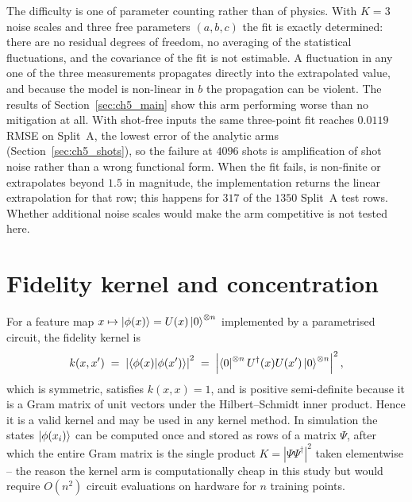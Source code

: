 The difficulty is one of parameter counting rather than of physics. With $K = 3$
noise scales and three free parameters $(a, b, c)$ the fit is exactly determined:
there are no residual degrees of freedom, no averaging of the statistical
fluctuations, and the covariance of the fit is not estimable. A fluctuation in any
one of the three measurements propagates directly into the extrapolated value, and
because the model is non-linear in $b$ the propagation can be violent. The results
of Section~\ref{sec:ch5_main} show this arm performing worse than no mitigation at
all. With shot-free inputs the same three-point fit reaches $0.0119$ RMSE on Split~A,
the lowest error of the analytic arms (Section~\ref{sec:ch5_shots}), so the failure at
$4096$ shots is amplification of shot noise rather than a wrong functional form. When
the fit fails, is non-finite or extrapolates beyond $1.5$ in magnitude, the
implementation returns the linear extrapolation for that row; this happens for $317$
of the $1350$ Split~A test rows. Whether additional noise scales would make the arm
competitive is not tested here.

\section{Fidelity kernel and concentration}
\label{sec:appA_kernel}

For a feature map $x \mapsto \ket{\phi(x)} = U(x)\ket{0}^{\otimes n}$ implemented by
a parametrised circuit, the fidelity kernel is
\begin{equation}
    k(x, x') \;=\; \left| \braket{\phi(x) | \phi(x')} \right|^{2}
    \;=\; \left| \bra{0}^{\otimes n} U^{\dagger}(x) U(x') \ket{0}^{\otimes n} \right|^{2},
    \label{eq:appA_fidelity}
\end{equation}
which is symmetric, satisfies $k(x,x) = 1$, and is positive semi-definite because it
is a Gram matrix of unit vectors under the Hilbert--Schmidt inner product. Hence it
is a valid kernel and may be used in any kernel method. In simulation the states
$\ket{\phi(x_i)}$ can be computed once and stored as rows of a matrix $\Psi$, after
which the entire Gram matrix is the single product
$K = \left| \Psi \Psi^{\dagger} \right|^{2}$ taken elementwise -- the reason the
kernel arm is computationally cheap in this study but would require
$O(n^2)$ circuit evaluations on hardware for $n$ training points.

